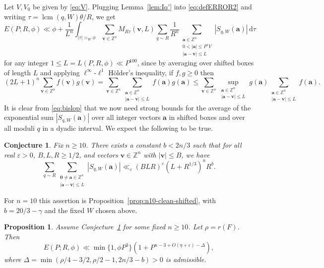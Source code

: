 \documentclass[a4paper,11pt, twoside,reqno]{amsart}
\theoremstyle{plain}
\newtheorem{conjecture}[thm]{Conjecture}
\newtheorem{prop}[thm]{Proposition}
\theoremstyle{definition}
\theoremstyle{remark}
\newcommand{\ZZ}{\mathbb{Z}}
\newcommand{\dd}{\mathrm{d}}
\newcommand{\ve}{\varepsilon}
\renewcommand{\le}{\leqslant}
\renewcommand{\leq}{\leqslant}
\renewcommand{\ge}{\geqslant}
\newcommand{\lcm}{\operatorname{lcm}}
\numberwithin{equation}{section}
\begin{document}
Let $V,V_0$ be given by \eqref{eq:V}.
Plugging Lemma~\ref{lem:Iq'} into \eqref{eq:defERROR2}
and writing $\tau = \lcm(q,W)\theta/R$,
we get
\begin{equation}\label{eq:bislop}
E(P;R,\phi)\ll \phi + \frac{1}{L^n} \int_{|\tau|\asymp_W \phi}
\sum_{\bm{v}\in \ZZ^n} M_{R\tau}(\bm{v},L)
\sum_{q\sim R} \frac{1}{R^n}
\sum_{\substack{\bm{a}\in \ZZ^n\\ 
0<|\bm{a}|\leq P^\ve V\\
|\bm{a}-\bm{v}| \le L}} |S_{q,W}(\bm{a})|
\,\dd\tau
\end{equation}
for any integer
$1\le L=L(P,R,\phi)\ll P^{100}$,
since by averaging over shifted boxes of length $L$
and applying $\ell^\infty$-$\ell^1$ H\"{o}lder's inequality,
if $f,g\ge 0$ then
\begin{equation*}
(2L+1)^n \sum_{\bm{v}\in \ZZ^n} f(\bm{v}) g(\bm{v})
= \sum_{\bm{v}\in \ZZ^n}
\sum_{\substack{\bm{a}\in \ZZ^n\\ |\bm{a}-\bm{v}|\le L}} f(\bm{a}) g(\bm{a})
\le \sum_{\bm{v}\in \ZZ^n}
\sup_{\substack{\bm{a}\in \ZZ^n\\ |\bm{a}-\bm{v}|\le L}} g(\bm{a})
\sum_{\substack{\bm{a}\in \ZZ^n\\ |\bm{a}-\bm{v}|\le L}} f(\bm{a}).
\end{equation*}
It is clear from \eqref{eq:bislop} that we now need strong  bounds for the average of 
the exponential sum $|S_{q,W}(\bm{a})|$  over all integer vectors $\bm{a}$
in shifted boxes and over all moduli $q$ in a dyadic interval. 
We expect the following to be true. 

\begin{conjecture}
\label{conj:clean-shifted}
Fix $n\ge 10$.
There exists a constant $b < 2n/3$ such that
for all real $\ve>0$,
$B,L,R\ge 1/2$,
and vectors $\bm{v}\in \ZZ^n$ with $|\bm{v}|\le B$,
we have
\begin{equation*}
\sum_{q\sim R} 
\sum_{\substack{\bm{0}\ne \bm{a}\in \ZZ^n\\ 
|\bm{a}-\bm{v}| \le L}} |S_{q,W}(\bm{a})|
\ll_\ve (BLR)^\ve (L + R^{1/3})^n R^b.
\end{equation*}
\end{conjecture}
For $n=10$ this assertion is Proposition~\ref{prop:n10-clean-shifted},
with $b=20/3-\gamma$ and the fixed $W$ chosen above.


\begin{prop}
\label{prop:remove-integral}
Assume Conjecture~\ref{conj:clean-shifted} for some fixed $n\ge 10$.
Let $\rho=r(F)$.
Then
\begin{equation*}
E(P;R,\phi) \ll \min\{1,\phi P^3\} \left(1 + P^{n-3+O(\eta+\ve)-\Delta}\right),
\end{equation*}
where $\Delta = \min(\rho/4-3/2, \rho/2-1, 2n/3-b) > 0$ is admissible.
\end{prop}
\end{document}
